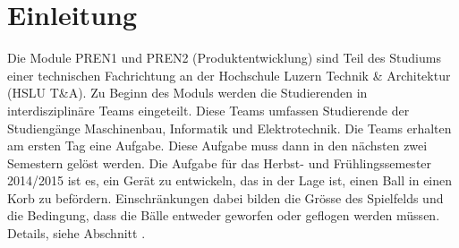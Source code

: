 \section{Einleitung}
Die Module PREN1 und PREN2 (Produktentwicklung) sind Teil des Studiums einer 
technischen Fachrichtung an der Hochschule Luzern Technik \& Architektur 
(HSLU T\&A). 
Zu Beginn des Moduls werden die Studierenden in interdisziplinäre Teams 
eingeteilt. Diese Teams umfassen Studierende der Studiengänge Maschinenbau, 
Informatik und Elektrotechnik. Die Teams erhalten am ersten Tag eine Aufgabe. 
Diese Aufgabe muss dann in den nächsten zwei Semestern gelöst werden. 
Die Aufgabe für das Herbst- und Frühlingssemester 2014/2015 ist es, ein Gerät
zu entwickeln, das in der Lage ist, einen Ball in einen Korb zu befördern.
Einschränkungen dabei bilden die Grösse des Spielfelds und die Bedingung, dass
die Bälle entweder geworfen oder geflogen werden müssen. 
Details, siehe Abschnitt . 

